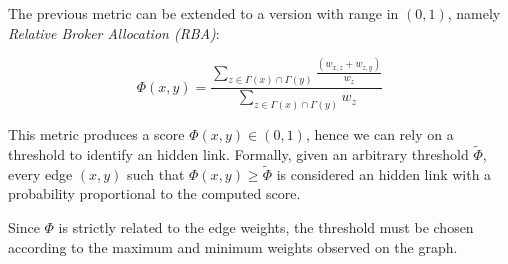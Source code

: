 
The previous metric can be extended to a version with range in $(0,1)$, namely \textit{Relative Broker Allocation (RBA)}:

\begin{equation}
\label{eqn:rba-local}
\Phi(x,y)=
\frac{\sum\limits_{z\in\Gamma(x)\cap\Gamma(y)}\frac{(w_{x,z}+w_{z,y})}{w_{z}}}
{\sum\limits_{z\in\Gamma(x)\cap\Gamma(y)}w_{z}}
\end{equation}

This metric produces a score $\Phi(x,y)\in(0,1)$, hence we can rely on a threshold to identify an hidden link. Formally, given an arbitrary threshold $\tilde{\Phi}$, every edge $(x,y)$ such that $\Phi(x,y)\geq\tilde{\Phi}$ is considered an hidden link with a probability proportional to the computed score.

Since $\Phi$ is strictly related to the edge weights, the threshold must be chosen according to the maximum and minimum weights observed on the graph.






